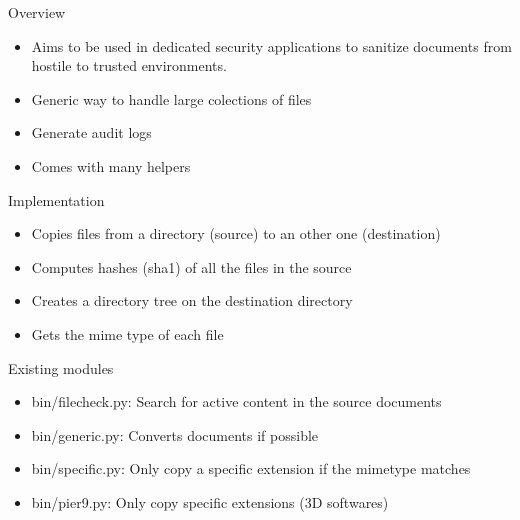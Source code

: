 
\begin{frame}[t,plain]
    \titlepage
\end{frame}

\begin{frame}[fragile]{Overview}
    \begin{itemize}
        \item Aims to be used in dedicated security applications to sanitize documents from hostile to trusted environments.
        \item Generic way to handle large colections of files
        \item Generate audit logs
        \item Comes with many helpers
   \end{itemize}
\end{frame}

\begin{frame}[fragile]{Implementation}
    \begin{itemize}
        \item Copies files from a directory (source) to an other one (destination)
        \item Computes hashes (sha1) of all the files in the source
        \item Creates a directory tree on the destination directory
        \item Gets the mime type of each file
   \end{itemize}
\end{frame}

\begin{frame}[fragile]{Existing modules}
    \begin{itemize}
        \item bin/filecheck.py: Search for active content in the source documents
        \item bin/generic.py: Converts documents if possible
        \item bin/specific.py: Only copy a specific extension if the mimetype matches
        \item bin/pier9.py: Only copy specific extensions (3D softwares)
   \end{itemize}
\end{frame}

